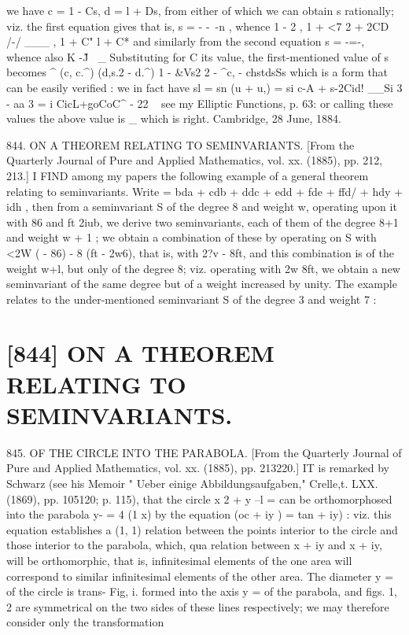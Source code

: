 \documentclass[11pt,a4paper]{book}
\begin{document}
we have c = 1 - Cs, d = l + Ds, from either of which we can obtain s rationally; viz. the first equation gives that is, s = - -~-n , whence 1 - 2 , 1 + <7 2 + 2CD /-/ ___ , 1 + C" l + C* and similarly from the second equation s = -=-, whence also K -\~ J~ _ Substituting for C its value, the first-mentioned value of s becomes ^ (c, c.^) (d,s.2 - d.^) 1 - &Vs2 2 - ^c, - chstdsSs which is a form that can be easily verified : we in fact have sl = sn (u + u,) = si c-A + s-2Cid! __Si 3 - aa 3 = i CicL+goCoC^ - 22 ~ see my Elliptic Functions, p. 63: or calling these values the above value is _ which is right. Cambridge, 28 June, 1884.

844. ON A THEOREM RELATING TO SEMINVARIANTS. [From the Quarterly Journal of Pure and Applied Mathematics, vol. xx. (1885), pp. 212, 213.] I FIND among my papers the following example of a general theorem relating to seminvariants. Write = bda + cdb + ddc + edd + fde + ffd/ + hdy + idh , then from a seminvariant S of the degree 8 and weight w, operating upon it with 86 and ft 2iub, we derive two seminvariants, each of them of the degree 8+1 and weight w + 1 ; we obtain a combination of these by operating on S with <2W ( - 86) - 8 (ft - 2w6), that is, with 2?v - 8ft, and this combination is of the weight w+l, but only of the degree 8; viz. operating with 2w 8ft, we obtain a new seminvariant of the same degree but of a weight increased by unity. The example relates to the under-mentioned seminvariant S of the degree 3 and weight 7 :

\vspace{1em}

\section*{[844] ON A THEOREM RELATING TO SEMINVARIANTS.}




845. OF THE CIRCLE INTO THE PARABOLA. [From the Quarterly Journal of Pure and Applied Mathematics, vol. xx. (1885), pp. 213220.] IT is remarked by Schwarz (see his Memoir " Ueber einige Abbildungsaufgaben," Crelle,t. LXX. (1869), pp. 105120; p. 115), that the circle x 2 + y --l = can be orthomorphosed into the parabola y- = 4 (1 x) by the equation \/(oc + iy ) = tan + iy) : viz. this equation establishes a (1, 1) relation between the points interior to the circle and those interior to the parabola, which, qua relation between x + iy and x + iy, will be orthomorphic, that is, infinitesimal elements of the one area will correspond to similar infinitesimal elements of the other area. The diameter y = of the circle is trans- Fig, i. formed into the axis y = of the parabola, and figs. 1, 2 are symmetrical on the two sides of these lines respectively; we may therefore consider only the transformation
\end{document}
